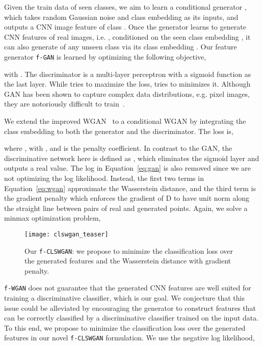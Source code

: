 \documentclass[10pt,twocolumn,letterpaper]{article}
\newcommand{\myparagraph}[1]{\vspace{6pt}\noindent{\bf #1}}
\begin{document}
 






\myparagraph{\texttt{f-GAN}.} Given the train data  of seen classes, we aim to learn a conditional generator , which takes random Gaussian noise  and class embedding  as its inputs, and outputs a CNN image feature  of class . Once the generator  learns to generate CNN features of real images, i.e. , conditioned on the seen class embedding , it can also generate  of any unseen class  via its class embedding . 
Our feature generator \texttt{f-GAN} is learned by optimizing the following objective,

with . The discriminator  is a multi-layer perceptron with a sigmoid function as the last layer. While  tries to maximize the loss,  tries to minimizes it. Although GAN has been shown to capture complex data distributions, e.g. pixel images, they are notoriously difficult to train~\cite{arjovsky2017towards}.


\myparagraph{\texttt{f-WGAN}.} 
We extend the improved WGAN~\cite{gulrajani2017improved} 
to a conditional WGAN by integrating the class embedding  to both the generator and the discriminator. The loss is, 

where ,  with , and  is the penalty coefficient. In contrast to the GAN, the discriminative network here is defined as , which eliminates the sigmoid layer and outputs a real value. The log in Equation~\ref{eq:gan} is also removed since we are not optimizing the log likelihood. Instead, the first two terms in Equation~\ref{eq:wgan} approximate the Wasserstein distance, and the third term is the gradient penalty which enforces the gradient of D to have unit norm along the straight line between pairs of real and generated points. Again, we solve a minmax optimization problem, 


\begin{figure}[t]
	\centering
\texttt{[image: clswgan\_teaser]}
	\caption{Our \texttt{f-CLSWGAN}: we propose to minimize the classification loss over the generated features and the Wasserstein distance with gradient penalty.}
\vspace{-3mm}
	\label{fig:teaser}
\end{figure}

\myparagraph{\texttt{f-CLSWGAN}.} \texttt{f-WGAN} does not guarantee that the generated CNN features are well suited for training a discriminative classifier, which is our goal. We conjecture that this issue could be alleviated by encouraging the generator to construct features that can be correctly classified by a discriminative classifier trained on the input data. To this end, we propose to minimize the classification loss over the generated features in our novel \texttt{f-CLSWGAN} formulation. We use the negative log likelihood, 
\end{document}
